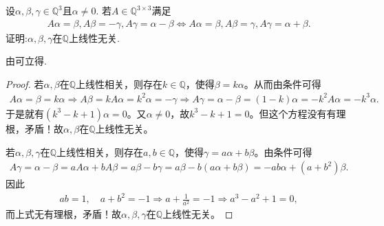 \documentclass[../../main.tex]{subfiles}%
\begin{document}
\begin{example}\label{example:有理数域上线性变换与向量组线性无关的命题}
设$\alpha, \beta, \gamma \in \mathbb{Q}^3$且$\alpha \neq 0$. 若$A \in \mathbb{Q}^{3 \times 3}$满足
\begin{align*}
A\alpha =\beta ,A\beta =-\gamma ,A\gamma =\alpha -\beta \Longleftrightarrow A\alpha =\beta ,A\beta =\gamma ,A\gamma =\alpha +\beta .
\end{align*}
证明:$\alpha, \beta, \gamma$在$\mathbb{Q}$上线性无关.
\end{example}
\begin{note}
由可立得.
\end{note}
\begin{proof}

若$\alpha, \beta$在$\mathbb{Q}$上线性相关，则存在$k\in \mathbb{Q}$，使得$\beta =k\alpha$。从而由条件可得
\begin{align*}
A\alpha =\beta =k\alpha \Longrightarrow A\beta =kA\alpha =k^2\alpha =-\gamma 
\Longrightarrow A\gamma =\alpha -\beta =\left( 1-k \right) \alpha =-k^2A\alpha =-k^3\alpha .
\end{align*}
于是就有$\left( k^3-k+1 \right) \alpha =0$。又$\alpha \ne 0$，故$k^3-k+1=0$。但这个方程没有有理根，矛盾！故$\alpha, \beta$在$\mathbb{Q}$上线性无关。

若$\alpha, \beta, \gamma$在$\mathbb{Q}$上线性相关，则存在$a,b\in \mathbb{Q}$，使得$\gamma =a\alpha +b\beta$。由条件可得
\begin{align*}
A\gamma =\alpha -\beta =aA\alpha +bA\beta =a\beta -b\gamma =a\beta -b\left( a\alpha +b\beta \right) =-ab\alpha +\left( a+b^2 \right) \beta .
\end{align*}
因此
\begin{align*}
ab=1,\quad a+b^2=-1\Longrightarrow a+\frac{1}{a^2}=-1\Longrightarrow a^3-a^2+1=0,
\end{align*}
而上式无有理根，矛盾！故$\alpha, \beta, \gamma$在$\mathbb{Q}$上线性无关。

\end{proof}
\end{document}
